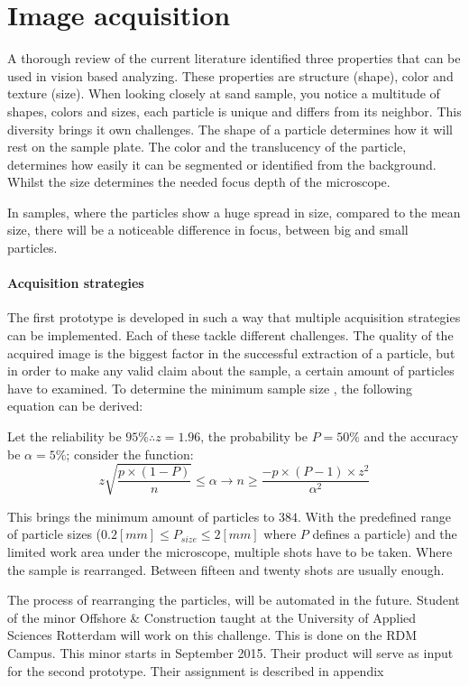 \documentclass[11pt,fleqn,,a4paper,twoside,openright]{book}
\begin{document}
\section{Image acquisition}
A thorough review of the current literature \cite{Spijker14a} identified three properties that can be used in vision based analyzing. These properties are structure  (shape), color and texture  (size). When looking closely at sand sample, you notice a multitude of shapes, colors and sizes, each particle is unique and differs from its neighbor. This diversity brings it own challenges. The shape of a particle determines how it will rest on the sample plate. The color and the translucency of the particle, determines how easily it can be segmented or identified from the background. Whilst the size determines the needed focus depth of the microscope. 
\begin{remark}
	In samples, where the particles show a huge spread in size, compared to the mean size, there will be a noticeable difference in focus, between big and small particles. 
\end{remark}

\paragraph{Acquisition strategies}The first prototype is developed in such a way that multiple acquisition strategies can be implemented. Each of these tackle different challenges. The quality of the acquired image is the biggest factor in the successful extraction of a particle, but in order to make any valid claim about the sample, a certain amount of particles have to examined. To determine the minimum sample size , the following equation can be derived:
\begin{sBox}
	Let the reliability be $95\% \therefore z=1.96$, the probability be $P=50\%$ and the accuracy be $\alpha=5\%$; consider the function:
	\begin{equation}
	z\sqrt{\frac{p\times(1-P)}{n}}\leq\alpha \rightarrow n\geq\frac{-p\times(P-1)\times z^2}{\alpha^2}
	\end{equation}
\end{sBox}
This brings the minimum amount of particles to $384$. With the predefined range of particle sizes ($0.2[mm]\leq P_{size} \leq 2[mm]$ where $P$ defines a particle) and the limited work area under the microscope, multiple shots have to be taken. Where the sample is rearranged. Between fifteen and twenty shots are usually enough.
\begin{remark}
	 The process of rearranging the particles, will be automated in the future. Student of the minor Offshore \& Construction taught at the University of Applied Sciences Rotterdam will work on this challenge. This is done on the RDM Campus. This minor starts in September 2015. Their product will serve as input for the second prototype. Their assignment is described in appendix %
\end{remark}
\end{document}
